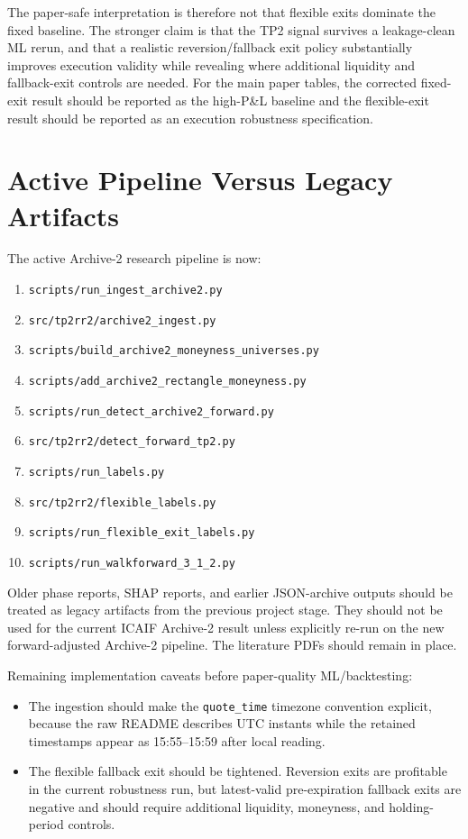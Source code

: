 \documentclass[11pt]{article}
\begin{document}
The paper-safe interpretation is therefore not that flexible exits dominate the
fixed baseline. The stronger claim is that the TP2 signal survives a
leakage-clean ML rerun, and that a realistic reversion/fallback exit policy
substantially improves execution validity while revealing where additional
liquidity and fallback-exit controls are needed. For the main paper tables, the
corrected fixed-exit result should be reported as the high-P\&L baseline and
the flexible-exit result should be reported as an execution robustness
specification.

\section*{Active Pipeline Versus Legacy Artifacts}

The active Archive-2 research pipeline is now:

\begin{enumerate}
  \item \texttt{scripts/run\_ingest\_archive2.py}
  \item \texttt{src/tp2rr2/archive2\_ingest.py}
  \item \texttt{scripts/build\_archive2\_moneyness\_universes.py}
  \item \texttt{scripts/add\_archive2\_rectangle\_moneyness.py}
  \item \texttt{scripts/run\_detect\_archive2\_forward.py}
  \item \texttt{src/tp2rr2/detect\_forward\_tp2.py}
  \item \texttt{scripts/run\_labels.py}
  \item \texttt{src/tp2rr2/flexible\_labels.py}
  \item \texttt{scripts/run\_flexible\_exit\_labels.py}
  \item \texttt{scripts/run\_walkforward\_3\_1\_2.py}
\end{enumerate}

Older phase reports, SHAP reports, and earlier JSON-archive outputs should be
treated as legacy artifacts from the previous project stage. They should not be
used for the current ICAIF Archive-2 result unless explicitly re-run on the new
forward-adjusted Archive-2 pipeline. The literature PDFs should remain in place.

Remaining implementation caveats before paper-quality ML/backtesting:

\begin{itemize}
  \item The ingestion should make the \texttt{quote\_time} timezone convention
  explicit, because the raw README describes UTC instants while the retained
  timestamps appear as 15:55--15:59 after local reading.
  \item The flexible fallback exit should be tightened. Reversion exits are
  profitable in the current robustness run, but latest-valid pre-expiration
  fallback exits are negative and should require additional liquidity,
  moneyness, and holding-period controls.
\end{itemize}
\end{document}
